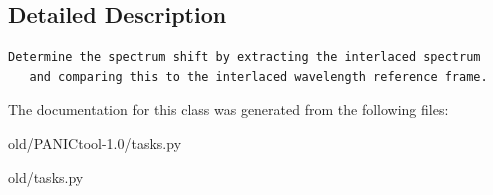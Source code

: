 \subsection{Detailed Description}


\footnotesize\begin{verbatim}Determine the spectrum shift by extracting the interlaced spectrum
   and comparing this to the interlaced wavelength reference frame.
\end{verbatim}
\normalsize
 



The documentation for this class was generated from the following files:\begin{CompactItemize}
\item 
old/PANICtool-1.0/tasks.py\item 
old/tasks.py\end{CompactItemize}
